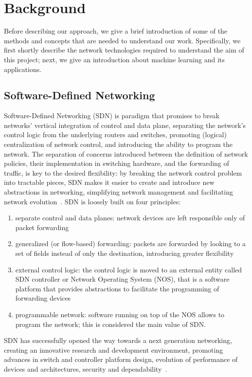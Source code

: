 \chapter{Background}
\label{ch:background}

Before describing our approach, we give a brief introduction of some of the methods and concepts that are needed to understand our  work. Specifically, we first shortly describe the network technologies required to understand the aim of this project; next, we give an introduction about machine learning and its applications. 

\section{Software-Defined Networking}
Software-Defined Networking (SDN) is paradigm that promises to break networks' vertical integration of control and data plane, separating the network's control logic from the underlying routers and switches, promoting (logical)  centralization  of  network  control,  and  introducing  the ability  to  program  the  network.  The  separation  of  concerns introduced   between   the   definition   of   network   policies,   their implementation  in  switching  hardware,  and  the  forwarding  of traffic, is key to the desired flexibility: by breaking the network control  problem  into  tractable  pieces,  SDN  makes  it  easier  to create and introduce new abstractions in networking, simplifying network  management  and  facilitating  network  evolution~\cite{kreutz2015software}. SDN is loosely built on four principles:
\begin{enumerate}
\item separate control and data planes: network devices are left responsible only of packet forwarding
\item generalized (or flow-based) forwarding: packets are forwarded by looking to a set of fields instead of only the destination, introducing greater flexibility~\cite{mckeown2008openflow}
\item external control logic: the control logic is moved to an external entity called SDN controller or Network Operating System (NOS), that is a software platform that provides abstractions to facilitate the programming of forwarding devices
\item programmable network: software running on top of the NOS allows to program the network; this is considered the main value of SDN.
\end{enumerate}
SDN has successfully opened the way towards a next generation networking, creating an innovative research
and  development  environment,  promoting  advances  in  switch  and  controller platform design,  evolution of performance  of  devices  and  architectures, security and dependability~\cite{sdnsurvey}.

